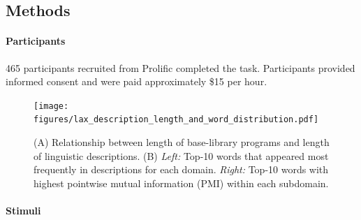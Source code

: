 \documentclass[10pt,letterpaper]{article}
\begin{document}
\subsection{Methods}

\paragraph{Participants}
465 participants recruited from Prolific completed the task. 
Participants provided informed consent and were paid approximately \$15 per hour. %

\begin{figure}[ht!]
  \begin{center}
  \texttt{[image: figures/lax\_description\_length\_and\_word\_distribution.pdf]}
  \caption{(A) Relationship between length of base-library programs and length of linguistic descriptions. (B) \textit{Left:} Top-10 words that appeared most frequently in descriptions for each domain. \textit{Right:} Top-10 words with highest pointwise mutual information (PMI) within each subdomain.}
  \label{fig:words}
  \end{center}
\end{figure}

\paragraph{Stimuli} 


\end{document}

